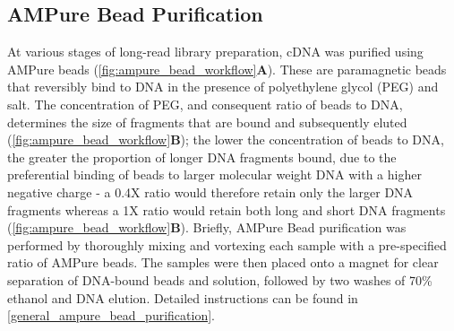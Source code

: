 \subsection{AMPure Bead Purification} 
\label{section:ch2_AMPure_explanation} 
At various stages of long-read library preparation, cDNA was purified using AMPure beads (\cref{fig:ampure_bead_workflow}\textbf{A}). These are paramagnetic beads that reversibly bind to DNA in the presence of polyethylene glycol (PEG) and salt. The concentration of PEG, and consequent ratio of beads to DNA, determines the size of fragments that are bound and subsequently eluted (\cref{fig:ampure_bead_workflow}\textbf{B}); the lower the concentration of beads to DNA, the greater the proportion of longer DNA fragments bound, due to the preferential binding of beads to larger molecular weight DNA with a higher negative charge - a 0.4X ratio would therefore retain only the larger DNA fragments whereas a 1X ratio would retain both long and short DNA fragments (\cref{fig:ampure_bead_workflow}\textbf{B}). Briefly, AMPure Bead purification was performed by thoroughly mixing and vortexing each sample with a pre-specified ratio of AMPure beads. The samples were then placed onto a magnet for clear separation of DNA-bound beads and solution, followed by two washes of 70\% ethanol and DNA elution. Detailed instructions can be found in \cref{general_ampure_bead_purification}.


